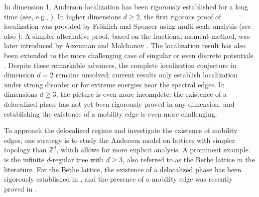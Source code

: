 \documentclass[10pt,reqno]{amsart}
\numberwithin{equation}{section}
\numberwithin{figure}{section}
\theoremstyle{plain} %
\theoremstyle{definition} %
\newcommand{\Z}{\mathbb{Z}}
\renewcommand{\geq}{\ge}
\numberwithin{equation}{section}
\begin{document}
In dimension 1, Anderson localization has been rigorously established for a long time (see, e.g., \cite{Carmona1982Exp,David2002Local,JIMSPL1977FAIA,cmp/1103908590,ishii1973localization}). 
In higher dimensions $d\geq 2$, the first rigorous proof of localization was provided by Fr{\"o}hlich and Spencer \cite{frohlich1983absence} using multi-scale analysis (see also \cite{frohlich1985constructive,von1989new,spencer1988localization}). A simpler alternative proof, based on the fractional moment method, was later introduced by Aizenman and Molchanov \cite{aizenman1994localization,aizenman1993localization}. %
The localization result has also been extended to the more challenging case of singular or even discrete potentials \cite{bourgain2005localization,klein2012comprehensive,carmona1987anderson,ding2020localization,li2022anderson}. %
Despite these remarkable advances, the complete localization conjecture in dimension $d=2$ remains unsolved; current results only establish localization under strong disorder or for extreme energies near the spectral edges. 
In dimensions $d\ge 3$, the picture is even more incomplete: the existence of a delocalized phase has not yet been rigorously proved in any dimension, and establishing the existence of a mobility edge is even more challenging. 


To approach the delocalized regime and investigate the existence of mobility edges, one strategy is to study the Anderson model on lattices with simpler topology than $\Z^d$, which allows for more explicit analysis. A prominent example is the infinite $d$-regular tree with $d\ge 3$, also referred to as the Bethe lattice in the literature. For the Bethe lattice, the existence of a delocalized phase has been rigorously established in \cite{Bethe_PRL, Bethe_JEMS}, and the presence of a mobility edge was recently proved in  \cite{aggarwal2025mobilityedgeandersonmodel}.
\end{document}
